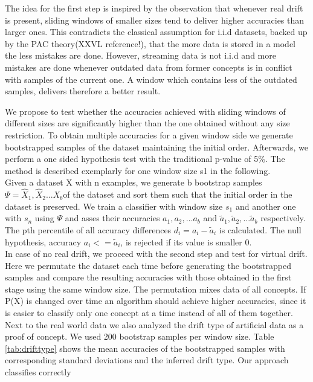 \documentclass[conference]{IEEEtran}
\begin{document}
The idea for the first step is inspired by the observation that whenever real drift is present, sliding windows of smaller sizes tend to deliver higher accuracies than larger ones. 
This contradicts the classical assumption for i.i.d datasets, backed up by the PAC theory(XXVL reference!), that the more data is stored in a model the less mistakes are done. 
However, streaming data is not i.i.d and more mistakes are done whenever outdated data from former concepts is in conflict with samples of the current one. 
A window which contains less of the outdated samples, delivers therefore a better result. 

We propose to test whether the accuracies achieved with sliding windows of different sizes are significantly higher than the one obtained without any size restriction. 
To obtain multiple accuracies for a given window side we generate bootstrapped samples of the dataset maintaining the initial order. 
Afterwards, we perform a one sided hypothesis test with the traditional p-value of 5\%.
The method is described exemplarly for one window size s1 in the following.\\
Given a dataset X with n examples, we generate b bootstrap samples $\Psi=\hat{X}_1,\hat{X}_2...{X}_b$of the dataset and sort them such that the initial order in the dataset is preserved. 
We train a classifier with window size $s_1$ and another one with $s_n$ using $\Psi$ and asses their accuracies $a_1,a_2,...a_b$ and $\tilde{a}_1,\tilde{a}_2,...\tilde{a}_b$ respectively.  
The pth percentile of all accuracy differences $d_i = a_i - \tilde{a}_i$ is calculated. The null hypothesis, accuracy $a_i <= \tilde{a}_i$, is rejected if its value is smaller 0.\\
In case of no real drift, we proceed with the second step and test for virtual drift. Here we permutate the dataset each time before generating the bootstrapped samples and compare
the resulting accuracies with those obtained in the first stage using the same window size. The permutation mixes data of all concepts. If P(X) is changed over time an 
algorithm should achieve higher accuracies, since it is easier to classify only one concept at a time instead of all of them together.\\
Next to the real world data we also analyzed the drift type of artificial data as a proof of concept. We used 200 bootstrap samples per window size.
Table \ref{tab:drifttype} shows the mean accuracies of the bootstrapped samples with corresponding standard deviations and the inferred drift type. Our approach classifies correctly
\end{document}
